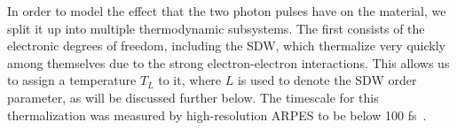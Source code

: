 
In order to model the effect that the two photon pulses have on the material, we split it up into multiple thermodynamic subsystems.
The first consists of the electronic degrees of freedom, including the SDW, which thermalize very quickly among themselves due to the strong electron-electron interactions.
This allows us to assign a temperature $T_L$ to it, where $L$ is used to denote the SDW order parameter, as will be discussed further below.
The timescale for this thermalization was measured by high-resolution ARPES to be below 100 fs~\cite{Nicholson2016}.

